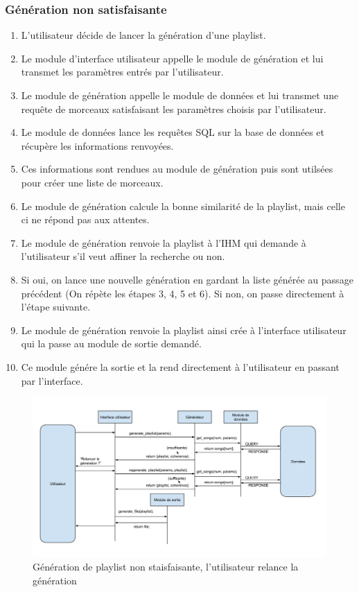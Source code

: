 \subsubsection{Génération non satisfaisante}

\begin{enumerate}
\item L'utilisateur décide de lancer la génération d'une playlist.
\item Le module d'interface utilisateur appelle le module de génération et 
lui transmet les paramètres entrés par l'utilisateur.
\item Le module de génération appelle le module de données et lui transmet 
une requête de morceaux satisfaisant les paramètres choisis par l'utilisateur.
\item Le module de données lance les requêtes SQL sur la base de données et
récupère les informations renvoyées.
\item Ces informations sont rendues au module de génération puis sont 
utilsées pour créer une liste de morceaux.
\item Le module de génération calcule la bonne similarité de la playlist, 
mais celle ci ne répond pas aux attentes.
\item Le module de génération renvoie la playlist à l'IHM qui demande à 
l'utilisateur s'il veut affiner la recherche ou non.
\item Si oui, on lance une nouvelle génération en gardant la liste générée 
au passage précédent (On répète les étapes 3, 4, 5 et 6). Si non, on passe 
directement à l'étape suivante.
\item Le module de génération renvoie la playlist ainsi crée à l'interface 
utilisateur qui la passe au module de sortie demandé.
\item Ce module génére la sortie et la rend directement à l'utilisateur en 
passant par l'interface.
\end{enumerate}

\begin{figure}[!h]
\includegraphics[width=14cm]{data/generation_decevante.png}
\caption{Génération de playlist non staisfaisante, l'utilisateur relance la génération}
\end{figure}
 

